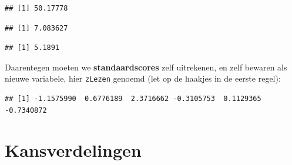 \documentclass[
]{book}
\newenvironment{Shaded}{\begin{snugshade}}{\end{snugshade}}
\newcommand{\CommentTok}[1]{\textcolor[rgb]{0.56,0.35,0.01}{\textit{#1}}}
\newcommand{\KeywordTok}[1]{\textcolor[rgb]{0.13,0.29,0.53}{\textbf{#1}}}
\newcommand{\NormalTok}[1]{#1}
\newcommand{\OperatorTok}[1]{\textcolor[rgb]{0.81,0.36,0.00}{\textbf{#1}}}
\newcommand{\StringTok}[1]{\textcolor[rgb]{0.31,0.60,0.02}{#1}}
\begin{document}
\begin{verbatim}
## [1] 50.17778
\end{verbatim}

\begin{Shaded}
\end{Shaded}

\begin{verbatim}
## [1] 7.083627
\end{verbatim}

\begin{Shaded}
\end{Shaded}

\begin{verbatim}
## [1] 5.1891
\end{verbatim}

Daarentegen moeten we \textbf{standaardscores} zelf uitrekenen, en zelf bewaren als nieuwe variabele, hier \texttt{zLezen} genoemd (let op de haakjes in de eerste regel):

\begin{Shaded}
\end{Shaded}

\begin{verbatim}
## [1] -1.1575990  0.6776189  2.3716662 -0.3105753  0.1129365 -0.7340872
\end{verbatim}

\hypertarget{ch:kansverdelingen}{%
\chapter{Kansverdelingen}\label{ch:kansverdelingen}}
\end{document}
